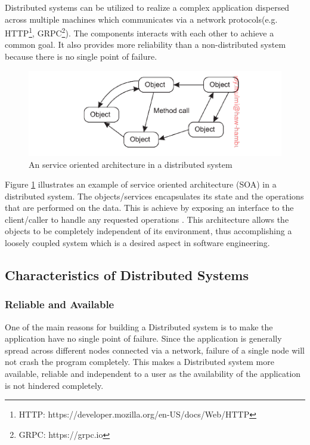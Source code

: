     \par
        Distributed systems can be utilized to realize a complex application dispersed across
        multiple machines which communicates via a network protocols(e.g. HTTP\footnote{HTTP: https://developer.mozilla.org/en-US/docs/Web/HTTP}, 
        GRPC\footnote{GRPC: https://grpc.io}). The 
        components interacts with each other to achieve a common goal. It also provides
        more reliability than a non-distributed system because there is no single point
        of failure. 

    \begin{figure}[H]
        \centering \includegraphics[scale=0.9]{grafiken/objectBasedDS.png}
        \caption{An service oriented architecture in a distributed system 
            \cite[p.~62]{DistributedSystems}}
        \label{fig:objectBasedDS}
    \end{figure}

    \par
        Figure \ref{fig:objectBasedDS} illustrates an example of service oriented architecture 
        (SOA) in a distributed system. The objects/services encapsulates its state and 
        the operations that are performed on the data. This is achieve by exposing an 
        interface to the client/caller to handle any requested operations
        \cite{DistributedSystems}. This architecture allows the objects to be
        completely independent of its environment, thus accomplishing a loosely
        coupled system which is a desired aspect in software engineering.
        
    \subsection{Characteristics of Distributed Systems} 
        \subsubsection{Reliable and Available}
        One of the main reasons for building a Distributed system is to make the application have no single point of failure.
        Since the application is generally spread across different nodes connected via a network, failure of a single node will not 
        crash the program completely. This makes a Distributed system more available, reliable and independent to a user as the availability
        of the application is not hindered completely.
        
